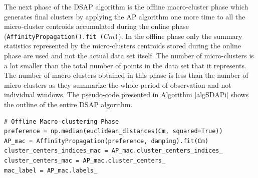 The next phase of the DSAP algorithm is the offline macro-cluster phase which generates final clusters by applying the AP algorithm one more time to all the micro-cluster centroids accumulated during the online phase (\texttt{AffinityPropagation().fit ($Cm$)}). In the offline phase only the summary statistics represented by the micro-clusters centroids stored during the online phase are used and not the actual data set itself. The number of micro-clusters is a lot smaller than the total number of points in the data set that it represents. The number of macro-clusters obtained in this phase is less than the number of micro-clusters as they summarize the whole period of observation and not individual windows. The pseudo-code presented in Algorithm \ref{algSDAPi} shows the outline of the entire DSAP algorithm. 

\begin{lstlisting}
# Offline Macro-clustering Phase
preference = np.median(euclidean_distances(Cm, squared=True))
AP_mac = AffinityPropagation(preference, damping).fit(Cm)
cluster_centers_indices_mac = AP_mac.cluster_centers_indices_
cluster_centers_mac = AP_mac.cluster_centers_
mac_label = AP_mac.labels_

\end{lstlisting}



